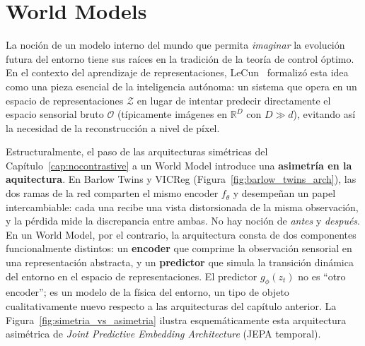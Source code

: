 \section{World Models}
\label{sec:world_model_definicion}

La noción de un modelo interno del mundo que permita \emph{imaginar} la evolución futura del entorno tiene sus raíces en la tradición de la teoría de control óptimo. En el contexto del aprendizaje de representaciones, LeCun~\cite{lecun2022path} formalizó esta idea como una pieza esencial de la inteligencia autónoma: un sistema que opera en un espacio de representaciones $\mathcal{Z}$ en lugar de intentar predecir directamente el espacio sensorial bruto $\mathcal{O}$ (típicamente imágenes en $\mathbb{R}^D$ con $D \gg d$), evitando así la necesidad de la reconstrucción a nivel de píxel.

Estructuralmente, el paso de las arquitecturas simétricas del Capítulo~\ref{cap:nocontrastive} a un World Model introduce una \textbf{asimetría en la aquitectura}. En Barlow Twins y VICReg (Figura~\ref{fig:barlow_twins_arch}), las dos ramas de la red comparten el mismo encoder $f_\theta$ y desempeñan un papel intercambiable: cada una recibe una vista distorsionada de la misma observación, y la pérdida mide la discrepancia entre ambas. No hay noción de \emph{antes} y \emph{después}. En un World Model, por el contrario, la arquitectura consta de dos componentes funcionalmente distintos: un \textbf{encoder} que comprime la observación sensorial en una representación abstracta, y un \textbf{predictor} que simula la transición dinámica del entorno en el espacio de representaciones. El predictor $g_\phi(z_t)$ no es ``otro encoder''; es un modelo de la física del entorno, un tipo de objeto cualitativamente nuevo respecto a las arquitecturas del capítulo anterior. La Figura~\ref{fig:simetria_vs_asimetria} ilustra esquemáticamente esta arquitectura asimétrica  de \textit{Joint Predictive Embedding Architecture} (JEPA temporal).

